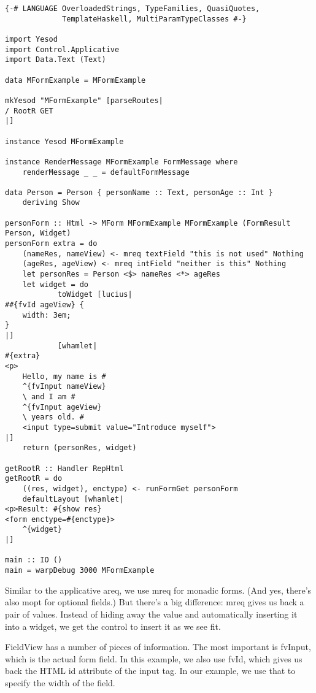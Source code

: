 \begin{lstlisting}
{-# LANGUAGE OverloadedStrings, TypeFamilies, QuasiQuotes,
             TemplateHaskell, MultiParamTypeClasses #-}

import Yesod
import Control.Applicative
import Data.Text (Text)

data MFormExample = MFormExample

mkYesod "MFormExample" [parseRoutes|
/ RootR GET
|]

instance Yesod MFormExample

instance RenderMessage MFormExample FormMessage where
    renderMessage _ _ = defaultFormMessage

data Person = Person { personName :: Text, personAge :: Int }
    deriving Show

personForm :: Html -> MForm MFormExample MFormExample (FormResult Person, Widget)
personForm extra = do
    (nameRes, nameView) <- mreq textField "this is not used" Nothing
    (ageRes, ageView) <- mreq intField "neither is this" Nothing
    let personRes = Person <$> nameRes <*> ageRes
    let widget = do
            toWidget [lucius|
##{fvId ageView} {
    width: 3em;
}
|]
            [whamlet|
#{extra}
<p>
    Hello, my name is #
    ^{fvInput nameView}
    \ and I am #
    ^{fvInput ageView}
    \ years old. #
    <input type=submit value="Introduce myself">
|]
    return (personRes, widget)

getRootR :: Handler RepHtml
getRootR = do
    ((res, widget), enctype) <- runFormGet personForm
    defaultLayout [whamlet|
<p>Result: #{show res}
<form enctype=#{enctype}>
    ^{widget}
|]

main :: IO ()
main = warpDebug 3000 MFormExample
\end{lstlisting}

Similar to the applicative areq, we use mreq for monadic forms. (And yes, there's also
mopt for optional fields.) But there's a big difference: mreq gives us back a pair of
values. Instead of hiding away the 
 value and automatically inserting it into a
widget, we get the control to insert it as we see fit.

FieldView has a number of pieces of information. The most important is fvInput, which is
the actual form field. In this example, we also use fvId, which gives us back the HTML id
attribute of the input tag. In our example, we use that to specify the width of the field.

